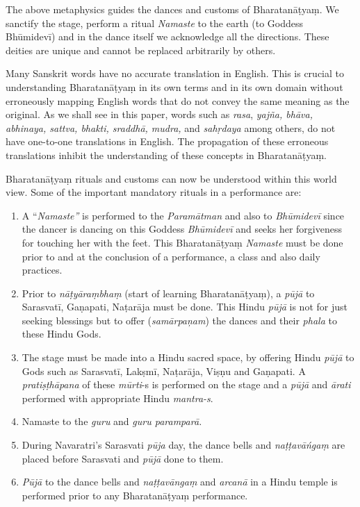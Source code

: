 The above metaphysics guides the dances and customs of Bharata\-nāṭyaṃ. We sanctify the stage, perform a ritual \textit{Namaste} to the earth (to Goddess Bhūmidevī) and in the dance itself we acknowledge all the directions. These deities are unique and cannot be replaced arbitrarily by others.

Many Sanskrit words have no accurate translation in English. This is crucial to understanding Bharatanāṭyaṃ in its own terms and in its own domain without erroneously mapping English words that do not convey the same meaning as the original. As we shall see in this paper, words such as \textit{rasa}, \textit{yajña, bhāva, abhinaya, sattva, bhakti, sraddhā, mudra,} and \textit{sahṛdaya} among others, do not have one-to-one translations in English. The propagation of these erroneous translations inhibit the understanding of these concepts in Bharatanāṭyaṃ.

Bharatanāṭyaṃ rituals and customs can now be understood within this world view. Some of the important mandatory rituals in a performance are:

\begin{enumerate}[{\rm 1)}]
\itemsep=0pt
\item A “\textit{Namaste”} is performed to the \textit{Paramātman }and also to \textit{Bhūmidevī} since the dancer is dancing on this Goddess \textit{Bhūmidevī} and seeks her forgiveness for touching her with the feet. This Bharatanāṭyaṃ \textit{Namaste }must be done prior to and at the conclusion of a performance, a class and also daily practices.

 \item Prior to \textit{nāṭyāraṃbhaṃ }(start of learning Bharatanāṭyaṃ), a \textit{pūjā }to Sarasvatī, Gaṇapati, Naṭarāja must be done. This Hindu \textit{pūjā }is not for just seeking blessings but to offer (\textit{samārpaņam}) the dances and their \textit{phala }to these Hindu Gods.

 \item The stage must be made into a Hindu sacred space, by offering Hindu \textit{pūjā }to Gods such as Sarasvatī, Lakṣmī, Naṭarāja, Viṣṇu and Gaṇapati. A \textit{pratiṣṭhāpana }of these \textit{mūrti}-s is performed on the stage and a \textit{pūjā }and \textit{ārati} performed with appropriate Hindu \textit{mantra-s}.

 \item Namaste to the \textit{guru} and \textit{guru paramparā.}

 \item During Navaratri’s Sarasvati \textit{pūja} day, the dance bells and \textit{naṭṭavāńgaṃ} are placed before Sarasvati and \textit{pūjā }done to them.

 \item \textit{Pūjā} to the dance bells and \textit{naṭṭavāngaṃ} and \textit{arcanā} in a Hindu temple is performed prior to any Bharatanāṭyaṃ performance.

\end{enumerate}

